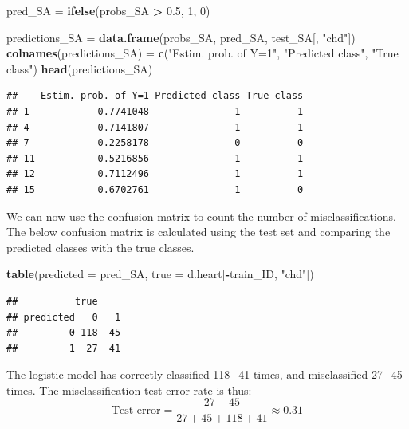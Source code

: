 \documentclass[10pt,ignorenonframetext,]{beamer}
\newenvironment{Shaded}{\begin{snugshade}}{\end{snugshade}}
\newcommand{\KeywordTok}[1]{\textcolor[rgb]{0.13,0.29,0.53}{\textbf{#1}}}
\newcommand{\DataTypeTok}[1]{\textcolor[rgb]{0.13,0.29,0.53}{#1}}
\newcommand{\DecValTok}[1]{\textcolor[rgb]{0.00,0.00,0.81}{#1}}
\newcommand{\FloatTok}[1]{\textcolor[rgb]{0.00,0.00,0.81}{#1}}
\newcommand{\StringTok}[1]{\textcolor[rgb]{0.31,0.60,0.02}{#1}}
\newcommand{\OperatorTok}[1]{\textcolor[rgb]{0.81,0.36,0.00}{\textbf{#1}}}
\newcommand{\NormalTok}[1]{#1}
\begin{document}
\begin{frame}[fragile]

\scriptsize

\begin{Shaded}
\begin{Highlighting}[]
\NormalTok{pred_SA =}\StringTok{ }\KeywordTok{ifelse}\NormalTok{(probs_SA }\OperatorTok{>}\StringTok{ }\FloatTok{0.5}\NormalTok{, }\DecValTok{1}\NormalTok{, }\DecValTok{0}\NormalTok{)}

\NormalTok{predictions_SA =}\StringTok{ }\KeywordTok{data.frame}\NormalTok{(probs_SA, pred_SA, test_SA[, }\StringTok{"chd"}\NormalTok{])}
\KeywordTok{colnames}\NormalTok{(predictions_SA) =}\StringTok{ }\KeywordTok{c}\NormalTok{(}\StringTok{"Estim. prob. of Y=1"}\NormalTok{, }\StringTok{"Predicted class"}\NormalTok{, }
    \StringTok{"True class"}\NormalTok{)}
\KeywordTok{head}\NormalTok{(predictions_SA)}
\end{Highlighting}
\end{Shaded}

\begin{verbatim}
##    Estim. prob. of Y=1 Predicted class True class
## 1            0.7741048               1          1
## 4            0.7141807               1          1
## 7            0.2258178               0          0
## 11           0.5216856               1          1
## 12           0.7112496               1          1
## 15           0.6702761               1          0
\end{verbatim}

\end{frame}

\begin{frame}[fragile]

We can now use the confusion matrix to count the number of
misclassifications. The below confusion matrix is calculated using the
test set and comparing the predicted classes with the true classes.

\begin{Shaded}
\begin{Highlighting}[]
\KeywordTok{table}\NormalTok{(}\DataTypeTok{predicted =}\NormalTok{ pred_SA, }\DataTypeTok{true =}\NormalTok{ d.heart[}\OperatorTok{-}\NormalTok{train_ID, }\StringTok{"chd"}\NormalTok{])}
\end{Highlighting}
\end{Shaded}

\begin{verbatim}
##          true
## predicted   0   1
##         0 118  45
##         1  27  41
\end{verbatim}

The logistic model has correctly classified 118+41 times, and
misclassified 27+45 times. The misclassification test error rate is
thus: \[\text{Test error} = \frac{27+45}{27+45+118+41} \approx 0.31\]

\end{frame}
\end{document}
